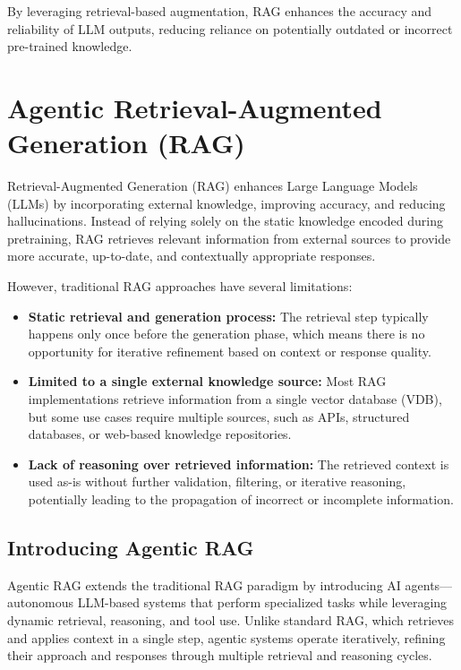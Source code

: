 By leveraging retrieval-based augmentation, RAG enhances the accuracy and reliability of LLM outputs, reducing reliance on potentially outdated or incorrect pre-trained knowledge.



\section{Agentic Retrieval-Augmented Generation (RAG)}

Retrieval-Augmented Generation (RAG) enhances Large Language Models (LLMs) by incorporating external knowledge, improving accuracy, and reducing hallucinations. Instead of relying solely on the static knowledge encoded during pretraining, RAG retrieves relevant information from external sources to provide more accurate, up-to-date, and contextually appropriate responses. 

However, traditional RAG approaches have several limitations:

\begin{itemize}
    \item \textbf{Static retrieval and generation process:} The retrieval step typically happens only once before the generation phase, which means there is no opportunity for iterative refinement based on context or response quality.
    \item \textbf{Limited to a single external knowledge source:} Most RAG implementations retrieve information from a single vector database (VDB), but some use cases require multiple sources, such as APIs, structured databases, or web-based knowledge repositories.
    \item \textbf{Lack of reasoning over retrieved information:} The retrieved context is used as-is without further validation, filtering, or iterative reasoning, potentially leading to the propagation of incorrect or incomplete information.
\end{itemize}

\subsection{Introducing Agentic RAG}
Agentic RAG extends the traditional RAG paradigm by introducing AI agents—autonomous LLM-based systems that perform specialized tasks while leveraging dynamic retrieval, reasoning, and tool use. Unlike standard RAG, which retrieves and applies context in a single step, agentic systems operate iteratively, refining their approach and responses through multiple retrieval and reasoning cycles.

